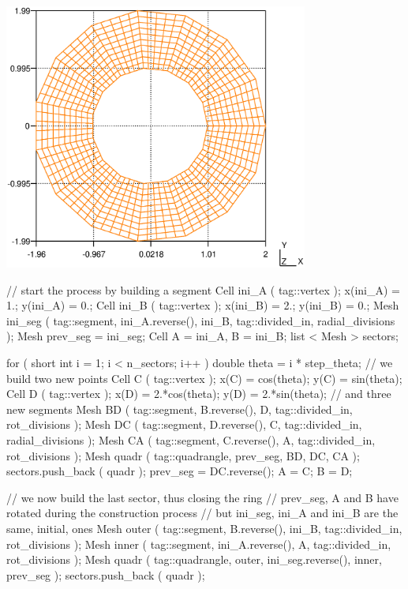 \centerline{\includegraphics[width=10cm]{ring.eps}}

\verbatim
   // start the process by building a segment
   Cell ini_A ( tag::vertex );  x(ini_A) = 1.;  y(ini_A) = 0.;
   Cell ini_B ( tag::vertex );  x(ini_B) = 2.;  y(ini_B) = 0.;
   Mesh ini_seg ( tag::segment, ini_A.reverse(), ini_B,
                  tag::divided_in, radial_divisions     );
   Mesh prev_seg = ini_seg;
   Cell A = ini_A,  B = ini_B;
   list < Mesh > sectors;

   for ( short int i = 1; i < n_sectors; i++ )
   {  double theta = i * step_theta;
      // we build two new points
      Cell C ( tag::vertex ); x(C) = cos(theta);    y(C) = sin(theta);
      Cell D ( tag::vertex ); x(D) = 2.*cos(theta); y(D) = 2.*sin(theta);
      // and three new segments
      Mesh BD ( tag::segment, B.reverse(), D, tag::divided_in, rot_divisions );
      Mesh DC ( tag::segment, D.reverse(), C, tag::divided_in, radial_divisions );
      Mesh CA ( tag::segment, C.reverse(), A, tag::divided_in, rot_divisions );
      Mesh quadr ( tag::quadrangle, prev_seg, BD, DC, CA );
      sectors.push_back ( quadr );
      prev_seg = DC.reverse();
      A = C;  B = D;                                                     }

   // we now build the last sector, thus closing the ring
   // prev_seg, A and B have rotated during the construction process
   // but ini_seg, ini_A and ini_B are the same, initial, ones
   Mesh outer ( tag::segment, B.reverse(), ini_B, tag::divided_in, rot_divisions );
   Mesh inner ( tag::segment, ini_A.reverse(), A, tag::divided_in, rot_divisions );
   Mesh quadr ( tag::quadrangle, outer, ini_seg.reverse(), inner, prev_seg );
   sectors.push_back ( quadr );
   

